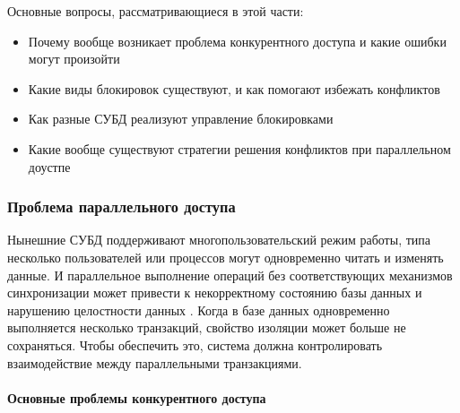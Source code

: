 Основные вопросы, рассматривающиеся в этой части:
\begin{itemize}
    \item Почему вообще возникает проблема конкурентного доступа и какие ошибки могут произойти
    \item Какие виды блокировок существуют, и как помогают избежать конфликтов
    \item Как разные СУБД реализуют управление блокировками
    \item Какие вообще существуют стратегии решения конфликтов при параллельном доустпе
\end{itemize}

\subsubsection{Проблема параллельного доступа}

Нынешние СУБД поддерживают многопользовательский режим работы, типа несколько пользователей или процессов могут одновременно читать и изменять данные. И параллельное выполнение операций без соответствующих механизмов синхронизации может привести к некорректному состоянию базы данных и нарушению целостности данных \autocite{ElmasriNavathe, Silberschatz}.
Когда в базе данных одновременно выполняется несколько транзакций, свойство изоляции может больше не сохраняться. Чтобы обеспечить это, система должна контролировать взаимодействие между параллельными транзакциями. \autocite{Silberschatz}

\paragraph{Основные проблемы конкурентного доступа} ~\\

